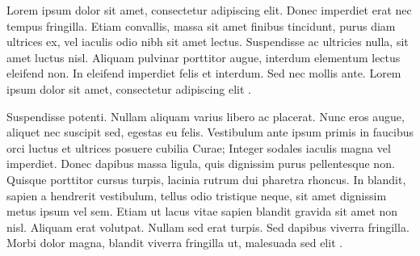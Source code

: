 Lorem ipsum dolor sit amet, consectetur adipiscing elit. Donec imperdiet erat nec tempus fringilla. Etiam convallis, massa sit amet finibus tincidunt, purus diam ultrices ex, vel iaculis odio nibh sit amet lectus. Suspendisse ac ultricies nulla, sit amet luctus nisl. Aliquam pulvinar porttitor augue, interdum elementum lectus eleifend non. In eleifend imperdiet felis et interdum. Sed nec mollis ante. Lorem ipsum dolor sit amet, consectetur adipiscing elit \cite{belkin2002using}.

Suspendisse potenti. Nullam aliquam varius libero ac placerat. Nunc eros augue, aliquet nec suscipit sed, egestas eu felis. Vestibulum ante ipsum primis in faucibus orci luctus et ultrices posuere cubilia Curae; Integer sodales iaculis magna vel imperdiet. Donec dapibus massa ligula, quis dignissim purus pellentesque non. Quisque porttitor cursus turpis, lacinia rutrum dui pharetra rhoncus. In blandit, sapien a hendrerit vestibulum, tellus odio tristique neque, sit amet dignissim metus ipsum vel sem. Etiam ut lacus vitae sapien blandit gravida sit amet non nisl. Aliquam erat volutpat. Nullam sed erat turpis. Sed dapibus viverra fringilla. Morbi dolor magna, blandit viverra fringilla ut, malesuada sed elit \cite{coifman2005geometric, varga2016multilingual}.
